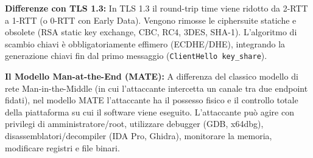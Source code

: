 \documentclass[11pt,a4paper]{article}
\begin{document}
\begin{solutionbox}
\textbf{Differenze con TLS 1.3:}
In TLS 1.3 il round-trip time viene ridotto da 2-RTT a 1-RTT (o 0-RTT con Early Data). Vengono rimosse le ciphersuite statiche e obsolete (RSA static key exchange, CBC, RC4, 3DES, SHA-1). L'algoritmo di scambio chiavi \`e obbligatoriamente effimero (ECDHE/DHE), integrando la generazione chiavi fin dal primo messaggio (\texttt{ClientHello key\_share}).
\end{solutionbox}

\begin{solutionbox}
\textbf{Il Modello Man-at-the-End (MATE):}
A differenza del classico modello di rete Man-in-the-Middle (in cui l'attaccante intercetta un canale tra due endpoint fidati), nel modello MATE l'attaccante ha il possesso fisico e il controllo totale della piattaforma su cui il software viene eseguito. L'attaccante pu\`o agire con privilegi di amministratore/root, utilizzare debugger (GDB, x64dbg), disassemblatori/decompiler (IDA Pro, Ghidra), monitorare la memoria, modificare registri e file binari.


\end{solutionbox}
\end{document}
